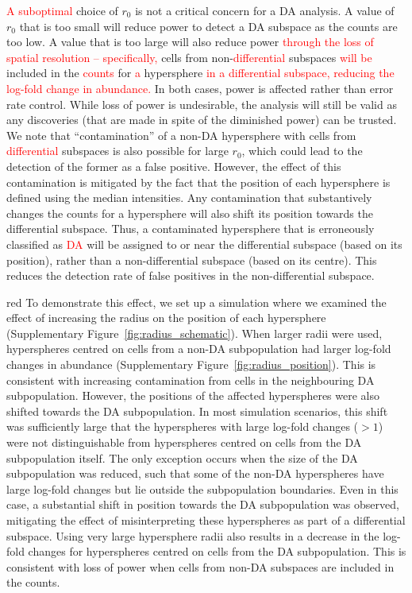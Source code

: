 \documentclass{article}
\newcommand\revised[1]{\textcolor{red}{#1}}
\begin{document}
\revised{A suboptimal} choice of $r_0$ is not a critical concern for a DA analysis.
A value of $r_0$ that is too small will reduce power to detect a DA subspace as the counts are too low.
A value that is too large will also reduce power \revised{through the loss of spatial resolution -- specifically,} cells from non-\revised{differential} subspaces \revised{will be} included in the \revised{counts} for \revised{a} hypersphere \revised{in a differential subspace, reducing the log-fold change in abundance.}
In both cases, power is affected rather than error rate control.
While loss of power is undesirable, the analysis will still be valid as any discoveries (that are made in spite of the diminished power) can be trusted.
We note that ``contamination'' of a non-DA hypersphere with cells from \revised{differential} subspaces is also possible for large $r_0$, which could lead to the detection of the former as a false positive.
However, the effect of this contamination is mitigated by the fact that the position of each hypersphere is defined using the median intensities.
Any contamination that substantively changes the counts for a hypersphere will also shift its position towards the differential subspace.
Thus, a contaminated hypersphere that is erroneously classified as \revised{DA} will be assigned to or near the differential subspace (based on its position), rather than a non-differential subspace (based on its centre).
This reduces the detection rate of false positives in the non-differential subspace.

\begin{color}{red}
To demonstrate this effect, we set up a simulation where we examined the effect of increasing the radius on the position of each hypersphere (Supplementary Figure~\ref{fig:radius_schematic}).
When larger radii were used, hyperspheres centred on cells from a non-DA subpopulation had larger log-fold changes in abundance (Supplementary Figure~\ref{fig:radius_position}).
This is consistent with increasing contamination from cells in the neighbouring DA subpopulation.
However, the positions of the affected hyperspheres were also shifted towards the DA subpopulation.
In most simulation scenarios, this shift was sufficiently large that the hyperspheres with large log-fold changes ($>1$) were not distinguishable from hyperspheres centred on cells from the DA subpopulation itself.
The only exception occurs when the size of the DA subpopulation was reduced, such that some of the non-DA hyperspheres have large log-fold changes but lie outside the subpopulation boundaries.
Even in this case, a substantial shift in position towards the DA subpopulation was observed, mitigating the effect of misinterpreting these hyperspheres as part of a differential subspace.
Using very large hypersphere radii also results in a decrease in the log-fold changes for hyperspheres centred on cells from the DA subpopulation.
This is consistent with loss of power when cells from non-DA subspaces are included in the counts.
\end{color}
\end{document}
